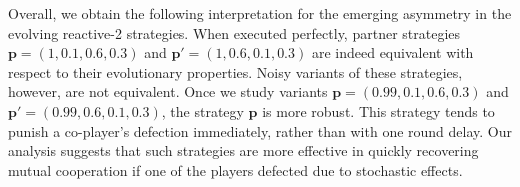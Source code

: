 \documentclass[9pt,twoside,lineno]{pnas-new}
\theoremstyle{plainCl1}
\theoremstyle{plainCl2}
\begin{document}
Overall, we obtain the following interpretation for the emerging asymmetry in the evolving reactive-2 strategies. 
When executed perfectly, partner strategies  $\mathbf{p}\!=\!(1,0.1,0.6,0.3)$ and $\mathbf{p'}\!=\!(1,0.6,0.1,0.3)$ are indeed equivalent with respect to their evolutionary properties. 
Noisy variants of these strategies, however, are not equivalent. 
Once we study variants $\mathbf{p}\!=\!(0.99,0.1,0.6,0.3)$ and $\mathbf{p'}\!=\!(0.99,0.6,0.1,0.3)$, the strategy $\mathbf{p}$ is more robust. 
This strategy tends to punish a co-player's defection immediately, rather than with one round delay. 
Our analysis suggests that such strategies are more effective in quickly recovering mutual cooperation if one of the players defected due to stochastic effects.  


\begin{table}[t]
  \centering
\end{table}
\end{document}
